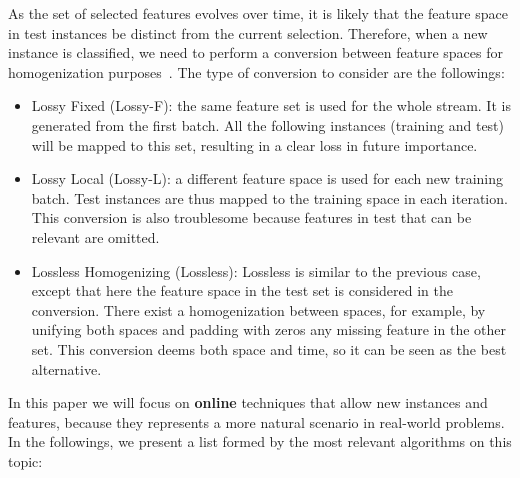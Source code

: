 \documentclass[preprint,12pt]{elsarticle}
\begin{document}
As the set of selected features evolves over time, it is likely that the feature space in test instances be distinct from the current selection. Therefore, when a new instance is classified, we need to perform a conversion between feature spaces for homogenization purposes~\cite{masud10}. The type of conversion to consider are the followings: 
\begin{itemize}
	\item Lossy Fixed (Lossy-F): the same feature set is used for the whole stream. It is generated from the first batch. All the following instances (training and test) will be mapped to this set, resulting in a clear loss in future importance.
	\item Lossy Local (Lossy-L): a different feature space is used for each new training batch. Test instances are thus mapped to the training space in each iteration. This conversion is also troublesome because features in test that can be relevant are omitted.
	\item Lossless Homogenizing (Lossless): Lossless is similar to the previous case, except that here the feature space in the test set is considered in the conversion. There exist a homogenization between spaces, for example, by unifying both spaces and padding with zeros any missing feature in the other set. This conversion deems both space and time, so it can be seen as the best alternative.
\end{itemize}

In this paper we will focus on \textbf{online} techniques that allow new instances and features, because they represents a more natural scenario in real-world problems. In the followings, we present a list formed by the most relevant algorithms on this topic:
\end{document}
